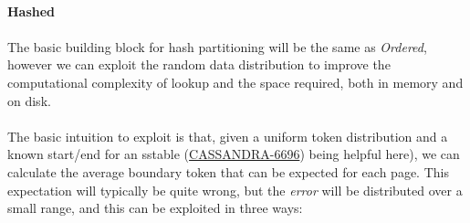 \documentclass[fleqn]{article}
\begin{document}
\paragraph{Hashed}
\paragraph{}
    The basic building block for hash partitioning will be the same as \textit{Ordered}, however we can exploit
    the random data distribution to improve the computational complexity of lookup and the space required, 
    both in memory and on disk.
    \\\\
    The basic intuition to exploit is that, given a uniform token distribution and a known start/end 
    for an sstable (\href{https://issues.apache.org/jira/browse/CASSANDRA-6696}{CASSANDRA-6696}) being 
    helpful here), we can calculate the average boundary token that can be expected for 
    each page. This expectation will typically be quite wrong, but the \textit{error} will be distributed 
    over a small range, and this can be exploited in three ways:
\end{document}
